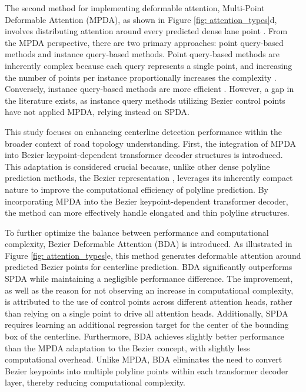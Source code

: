 The second method for implementing deformable attention, Multi-Point Deformable Attention (MPDA), as shown in Figure \ref{fig: attention_types}d, involves distributing attention around every predicted dense lane point \cite{liao2022maptr, yuan2024streammapnet, luo2023latr, xu2024insmapper, chen2025maptracker}. From the MPDA perspective, there are two primary approaches: point query-based methods and instance query-based methods. Point query-based methods are inherently complex because each query represents a single point, and increasing the number of points per instance proportionally increases the complexity \cite{liao2022maptr, liao2024maptrv2, luo2023latr, ding2023pivotnet, li2024enhancing}. Conversely, instance query-based methods are more efficient \cite{li2023lanesegnet, yuan2024streammapnet}. However, a gap in the literature exists, as instance query methods utilizing Bezier control points \cite{wu2023topomlp, li2023graph} have not applied MPDA, relying instead on SPDA.

This study focuses on enhancing centerline detection performance within the broader context of road topology understanding. First, the integration of MPDA into Bezier keypoint-dependent transformer decoder structures is introduced. This adaptation is considered crucial because, unlike other dense polyline prediction methods, the Bezier representation \cite{li2023lanesegnet} \cite{yuan2024streammapnet}, leverages its inherently compact nature to improve the computational efficiency of polyline prediction. By incorporating MPDA into the Bezier keypoint-dependent transformer decoder, the method can more effectively handle elongated and thin polyline structures.

To further optimize the balance between performance and computational complexity, Bezier Deformable Attention (BDA) is introduced. As illustrated in Figure \ref{fig: attention_types}e, this method generates deformable attention around predicted Bezier points for centerline prediction. BDA significantly outperforms SPDA while maintaining a negligible performance difference. The improvement, as well as the reason for not observing an increase in computational complexity, is attributed to the use of control points across different attention heads, rather than relying on a single point to drive all attention heads. Additionally, SPDA requires learning an additional regression target for the center of the bounding box of the centerline. Furthermore, BDA achieves slightly better performance than the MPDA adaptation to the Bezier concept, with slightly less computational overhead. Unlike MPDA, BDA eliminates the need to convert Bezier keypoints into multiple polyline points within each transformer decoder layer, thereby reducing computational complexity. %

